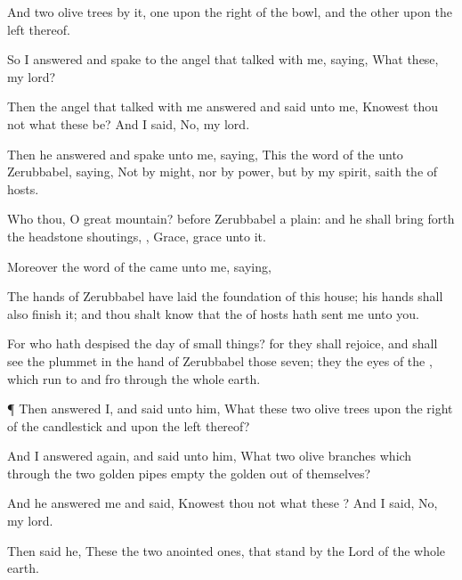 {And
two olive
trees by it,
one upon the
right
{} of the
bowl, and the
other upon the
left
{} thereof.

So I
answered and
spake to the
angel that
talked with me,
saying, What
{} these, my
lord?

Then the
angel that
talked with me
answered and
said unto me,
Knowest thou not what these be? And I
said, No, my
lord.

Then he
answered and
spake unto me,
saying, This
{} the
word of the
{} unto
Zerubbabel,
saying, Not by
might, nor by
power, but by my
spirit,
saith the
{} of
hosts.

Who
{} thou, O
great
mountain?
before
Zerubbabel
{} a
plain: and he shall bring
forth the
headstone
{}
shoutings,
{},
Grace,
grace unto it.

Moreover the
word of the
{} came unto me,
saying,

The
hands of
Zerubbabel have laid the
foundation of this
house; his
hands shall also
finish it; and thou shalt
know that the
{} of
hosts hath
sent me unto you.

For who hath
despised the
day of small
things? for they shall
rejoice, and shall
see the
plummet in the
hand of
Zerubbabel
{} those
seven; they
{} the
eyes of the
{}, which run to and
fro through the whole
earth.


\par }{\PP {}¶ Then
answered I, and
said unto him, What
{} these
two olive
trees upon the
right
{} of the
candlestick and upon the
left
{} thereof?

And I
answered
again, and
said unto him, What
{}
two
olive
branches which
through the
two
golden
pipes
empty the
golden
{} out of themselves?

And he
answered me and
said,
Knowest thou not what these
{}? And I
said, No, my
lord.

Then
said he, These
{} the
two
anointed
ones, that
stand by the
Lord of the whole
earth.




}
